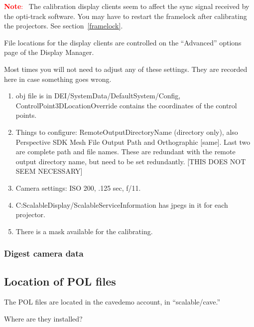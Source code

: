 \documentclass[11pt]{article}
\newenvironment{note}[1][Note]{\begin{lrbox}{\notebox}%
    \begin{minipage}{0.9\columnwidth}\textcolor{red}{\textbf{#1}:~}}%
    {\end{minipage}\end{lrbox}\begin{center}\setlength{\fboxsep}{8pt}%
    \fbox{\usebox{\notebox}}\end{center}}
\begin{document}
\begin{note}
  The calibration display clients seem to affect the sync signal
  received by the opti-track software.  You may have to restart the
  framelock after calibrating the projectors.  See
  section~\ref{framelock}.
\end{note}




File locations for the display clients are controlled on the
``Advanced'' options page of the Display Manager.

Most times you will not need to adjust any of these settings.  They
are recorded here in case something goes wrong.

\begin{enumerate}
\item obj file is in DEI/SystemData/DefaultSystem/Config,
  ControlPoint3DLocationOverride contains the coordinates of the
  control points.

\item Things to configure: RemoteOutputDirectoryName (directory only),
  also Perspective SDK Mesh File Output Path and Orthographic [same].
  Last two are complete path and file names.  These are redundant with
  the remote output directory name, but need to be set redundantly.
  [THIS DOES NOT SEEM NECESSARY]

\item Camera settings: ISO 200, .125 sec, f/11.

\item C:ScalableDisplay/ScalableServiceInformation has jpegs in it for
  each projector.

\item There is a mask available for the calibrating.
\end{enumerate}








\subsubsection{Digest camera data}

\subsection{Location of POL files}

The POL files are located in the cavedemo account, in ``scalable/cave.''


Where are they installed?
\end{document}
